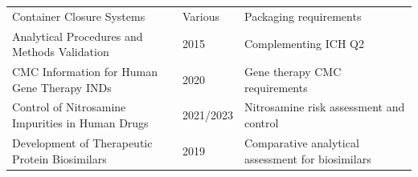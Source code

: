 \documentclass[
  11pt,
  a4paper,
]{report}
\begin{document}
\begin{longtable}[]{@{}lll@{}}
\begin{minipage}[t]{0.40\columnwidth}
Container Closure Systems\strut
\end{minipage} & \begin{minipage}[t]{0.24\columnwidth}\raggedright
Various\strut
\end{minipage} & \begin{minipage}[t]{0.28\columnwidth}\raggedright
Packaging requirements\strut
\end{minipage}\tabularnewline
\begin{minipage}[t]{0.40\columnwidth}\raggedright
Analytical Procedures and Methods Validation\strut
\end{minipage} & \begin{minipage}[t]{0.24\columnwidth}\raggedright
2015\strut
\end{minipage} & \begin{minipage}[t]{0.28\columnwidth}\raggedright
Complementing ICH Q2\strut
\end{minipage}\tabularnewline
\begin{minipage}[t]{0.40\columnwidth}\raggedright
CMC Information for Human Gene Therapy INDs\strut
\end{minipage} & \begin{minipage}[t]{0.24\columnwidth}\raggedright
2020\strut
\end{minipage} & \begin{minipage}[t]{0.28\columnwidth}\raggedright
Gene therapy CMC requirements\strut
\end{minipage}\tabularnewline
\begin{minipage}[t]{0.40\columnwidth}\raggedright
Control of Nitrosamine Impurities in Human Drugs\strut
\end{minipage} & \begin{minipage}[t]{0.24\columnwidth}\raggedright
2021/2023\strut
\end{minipage} & \begin{minipage}[t]{0.28\columnwidth}\raggedright
Nitrosamine risk assessment and control\strut
\end{minipage}\tabularnewline
\begin{minipage}[t]{0.40\columnwidth}\raggedright
Development of Therapeutic Protein Biosimilars\strut
\end{minipage} & \begin{minipage}[t]{0.24\columnwidth}\raggedright
2019\strut
\end{minipage} & \begin{minipage}[t]{0.28\columnwidth}\raggedright
Comparative analytical assessment for biosimilars\strut

\end{minipage}
\end{longtable}
\end{document}

